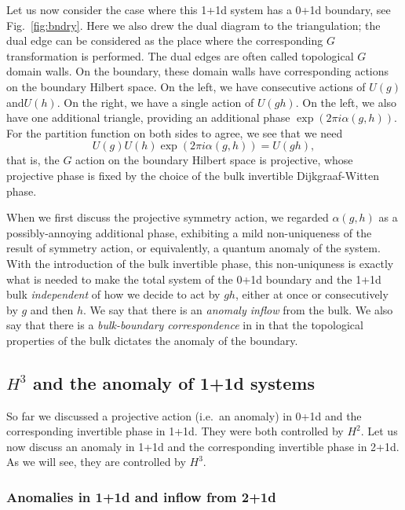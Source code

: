 \documentclass[12pt]{article}
\numberwithin{equation}{section}
\numberwithin{figure}{section}
\theoremstyle{remark}
\begin{document}
Let us now consider the case where this 1+1d system has a 0+1d boundary,
see Fig.~\ref{fig:bndry}.
Here we also drew the dual diagram to the triangulation;
the dual edge can be considered as the place where the corresponding $G$ transformation is performed.
The dual edges are often called topological $G$ domain walls.
On the boundary, these domain walls have corresponding actions on the boundary Hilbert space.
On the left, we have consecutive actions of $U(g)$ and$U(h)$.
On the right, we have a single action of $U(gh)$.
On the left, we also have one additional triangle, providing an additional phase 
$\exp(2\pi i \alpha(g,h))$.
For the partition function on both sides to agree, we see that we need \begin{equation}
U(g) U(h) \exp(2\pi i \alpha(g,h)) = U(gh),
\end{equation}
that is, the $G$ action on the boundary Hilbert space is projective,
 whose projective phase is fixed by the choice of the bulk invertible Dijkgraaf-Witten phase.

When we first discuss the projective symmetry action, 
we regarded $\alpha(g,h)$ as a possibly-annoying additional phase,
exhibiting a mild non-uniqueness  of the result of symmetry action,
or equivalently, a quantum anomaly of the system.
With the introduction of the bulk invertible phase,
this non-uniquness is exactly what is needed to make 
the total system of the 0+1d boundary
and the 1+1d bulk \emph{independent} of how we decide to act by $gh$,
either at once or consecutively by $g$ and then $h$.
We say that there is an \emph{anomaly inflow} from the bulk.
We also say that there is a \emph{bulk-boundary correspondence} in 
in that the topological properties of the bulk dictates the anomaly of the boundary.

\subsection{$H^3$ and the anomaly of 1+1d systems}

So far we discussed a projective action (i.e.~an anomaly) in 0+1d 
and the corresponding invertible phase in 1+1d.
They were both controlled by $H^2$.
Let us now discuss an anomaly in 1+1d and the corresponding invertible phase in 2+1d.
As we will see, they are controlled by $H^3$.

\subsubsection{Anomalies in 1+1d  and inflow from 2+1d}
\end{document}
